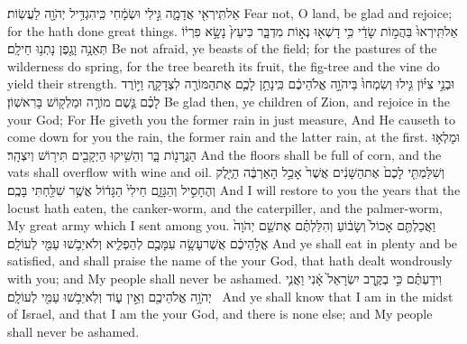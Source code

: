 {אַל\maqqaf תִּֽירְאִ֖י אֲדָמָ֑ה גִּ֣ילִי וּשְׂמָ֔חִי כִּֽי\maqqaf הִגְדִּ֥יל יְהֹוָ֖ה לַעֲשֽׂוֹת׃}
{Fear not, O land, be glad and rejoice; for the \lord\space hath done great things.}
{אַל\maqqaf תִּֽירְאוּ֙ בַּהֲמ֣וֹת שָׂדַ֔י כִּ֥י דָשְׁא֖וּ נְא֣וֹת מִדְבָּ֑ר כִּי\maqqaf עֵץ֙ נָשָׂ֣א פִרְי֔וֹ תְּאֵנָ֥ה וָגֶ֖פֶן נָתְנ֥וּ חֵילָֽם׃}
{Be not afraid, ye beasts of the field; for the pastures of the wilderness do spring, for the tree beareth its fruit, the fig-tree and the vine do yield their strength.}
{וּבְנֵ֣י צִיּ֗וֹן גִּ֤ילוּ וְשִׂמְחוּ֙ בַּיהֹוָ֣ה אֱלֹהֵיכֶ֔ם כִּֽי\maqqaf נָתַ֥ן לָכֶ֛ם אֶת\maqqaf הַמּוֹרֶ֖ה לִצְדָקָ֑ה וַיּ֣וֹרֶד לָכֶ֗ם גֶּ֛שֶׁם מוֹרֶ֥ה וּמַלְק֖וֹשׁ בָּרִאשֽׁוֹן׃}
{Be glad then, ye children of Zion, and rejoice in the \lord\space your God; For He giveth you the former rain in just measure, And He causeth to come down for you the rain, the former rain and the latter rain, at the first.}
{וּמָלְא֥וּ הַגֳּרָנ֖וֹת בָּ֑ר וְהֵשִׁ֥יקוּ הַיְקָבִ֖ים תִּיר֥וֹשׁ וְיִצְהָֽר׃}
{And the floors shall be full of corn, and the vats shall overflow with wine and oil.}
{וְשִׁלַּמְתִּ֤י לָכֶם֙ אֶת\maqqaf הַשָּׁנִ֔ים אֲשֶׁר֙ אָכַ֣ל הָאַרְבֶּ֔ה הַיֶּ֖לֶק וְהֶחָסִ֣יל וְהַגָּזָ֑ם חֵילִי֙ הַגָּד֔וֹל אֲשֶׁ֥ר שִׁלַּ֖חְתִּי בָּכֶֽם׃}
{And I will restore to you the years that the locust hath eaten, the canker-worm, and the caterpiller, and the palmer-worm, My great army which I sent among you.}
{וַאֲכַלְתֶּ֤ם אָכוֹל֙ וְשָׂב֔וֹעַ וְהִלַּלְתֶּ֗ם אֶת\maqqaf שֵׁ֤ם יְהֹוָה֙ אֱלֹ֣הֵיכֶ֔ם אֲשֶׁר\maqqaf עָשָׂ֥ה עִמָּכֶ֖ם לְהַפְלִ֑יא וְלֹא\maqqaf יֵבֹ֥שׁוּ עַמִּ֖י לְעוֹלָֽם׃}
{And ye shall eat in plenty and be satisfied, and shall praise the name of the \lord\space your God, that hath dealt wondrously with you; and My people shall never be ashamed.}
{וִידַעְתֶּ֗ם כִּ֣י בְקֶ֤רֶב יִשְׂרָאֵל֙ אָ֔נִי וַאֲנִ֛י יְהֹוָ֥ה אֱלֹהֵיכֶ֖ם וְאֵ֣ין ע֑וֹד וְלֹֽא\maqqaf יֵבֹ֥שׁוּ עַמִּ֖י לְעוֹלָֽם׃ \petucha }
{And ye shall know that I am in the midst of Israel, and that I am the \lord\space your God, and there is none else; and My people shall never be ashamed.}
\label{haft_53}
\setcounter{chap}{22}
\setcounter{verse}{1}
